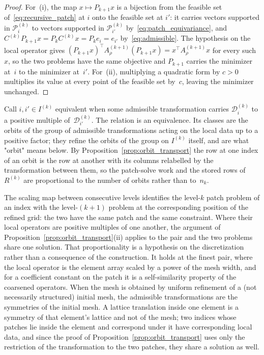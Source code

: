 \documentclass[hidelinks]{siamart}
\theoremstyle{nonumberplain}
\numberwithin{theorem}{section}
\begin{document}
\begin{proof}
For~(i), the map $x \mapsto P_{k+1} x$ is a bijection from the feasible
set of~\eqref{eq:recursive_patch} at $i$ onto the feasible set at $i'$:
it carries vectors supported in $\mathcal{P}^{(k)}_i$ to vectors
supported in $\mathcal{P}^{(k)}_{i'}$
by~\eqref{eq:patch_equivariance}, and
$C^{(k)} P_{k+1} x = P_k C^{(k)} x = P_k e_i = e_{i'}$
by~\eqref{eq:admissible}.  The hypothesis on the local operator gives
$(P_{k+1}x)^\top A^{(k+1)}_\rho (P_{k+1}x) = x^\top A^{(k+1)}_\rho x$ for
every such~$x$, so the two problems have the same objective and
$P_{k+1}$ carries the minimizer at~$i$ to the minimizer at~$i'$.
For~(ii), multiplying a quadratic form by $c > 0$ multiplies its value at
every point of the feasible set by~$c$, leaving the minimizer
unchanged.
\end{proof}

Call $i, i' \in I^{(k)}$ equivalent when some admissible transformation
carries $\mathcal{D}^{(k)}_i$ to a positive multiple
of~$\mathcal{D}^{(k)}_{i'}$.  The relation is an equivalence.  Its
classes are the orbits of the group of admissible transformations acting
on the local data up to a positive factor; they refine the orbits of the
group on $I^{(k)}$ itself, and are what "orbit" means below. By Proposition~\ref{prop:orbit_transport} the row at one index of an orbit is the row at another with its columns relabelled by the transformation between them, so the patch-solve work and the stored rows of $R^{(k)}$ are proportional to the number of orbits rather than to~$n_k$.

The scaling map between consecutive levels identifies the level-$k$
patch problem of an index with the level-$(k{+}1)$ problem at the
corresponding position of the refined grid: the two have the same patch
and the same constraint.  Where their local operators are positive
multiples of one another, the argument of
Proposition~\ref{prop:orbit_transport}(ii) applies to the pair and the
two problems share one solution.  That proportionality is
a hypothesis on the discretization rather than a consequence of the
construction.  It holds at the finest pair, where the local operator is
the element array scaled by a power of the mesh width, and for a
coefficient constant on the patch it is a self-similarity property of
the coarsened operators.
When the mesh is obtained by uniform refinement of a (not necessarily
structured) initial mesh, the admissible transformations are the
symmetries of the initial mesh.  A lattice translation inside one
element is a symmetry of that element's lattice and not of the mesh;
two indices whose patches lie inside the element and correspond under
it have corresponding local data, and since the proof of
Proposition~\ref{prop:orbit_transport} uses only the restriction of the
transformation to the two patches, they share a solution as well.
\end{document}
